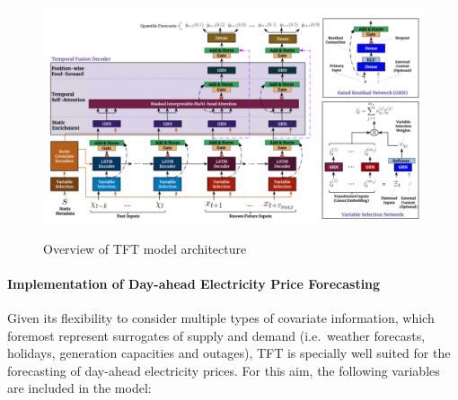 \documentclass[a4paper]{article}
\begin{document}
    \begin{figure}
\centering
{\includegraphics[keepaspectratio]{src/tft.png}}
\caption{Overview of TFT model architecture}
\end{figure}

    \paragraph{Implementation of Day-ahead Electricity Price
Forecasting}\label{implementation-of-day-ahead-electricity-price-forecasting}

Given its flexibility to consider multiple types of covariate
information, which foremost represent surrogates of supply and demand
(i.e.~weather forecasts, holidays, generation capacities and outages),
TFT is specially well suited for the forecasting of day-ahead
electricity prices. For this aim, the following variables are included
in the model:
\end{document}
